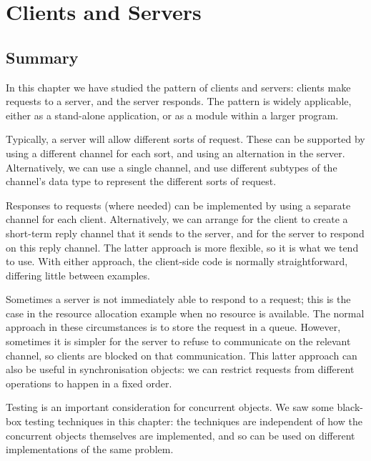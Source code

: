 \chapter{Clients and Servers}
\label{chap:clientServer}






\section{Summary}

In this chapter we have studied the pattern of clients and servers: clients
make requests to a server, and the server responds.  The pattern is widely
applicable, either as a stand-alone application, or as a module within a
larger program. 

Typically, a server will allow different sorts of request.  These can be
supported by using a different channel for each sort, and using an alternation
in the server.  Alternatively, we can use a single channel, and use different
subtypes of the channel's data type to represent the different sorts of
request.

Responses to requests (where needed) can be implemented by using a separate
channel for each client.  Alternatively, we can arrange for the client to
create a short-term reply channel that it sends to the server, and for the
server to respond on this reply channel.  The latter approach is more
flexible, so it is what we tend to use.  With either approach, the client-side
code is normally straightforward, differing little between examples.

Sometimes a server is not immediately able to respond to a request; this is
the case in the resource allocation example when no resource is available.
The normal approach in these circumstances is to store the request in a queue.
However, sometimes it is simpler for the server to refuse to communicate on
the relevant channel, so clients are blocked on that communication.  This
latter approach can also be useful in synchronisation objects: we can restrict
requests from different operations to happen in a fixed order.

Testing is an important consideration for concurrent objects.  We saw some
black-box testing techniques in this chapter: the techniques are independent
of how the concurrent objects themselves are implemented, and so can be used
on different implementations of the same problem.

